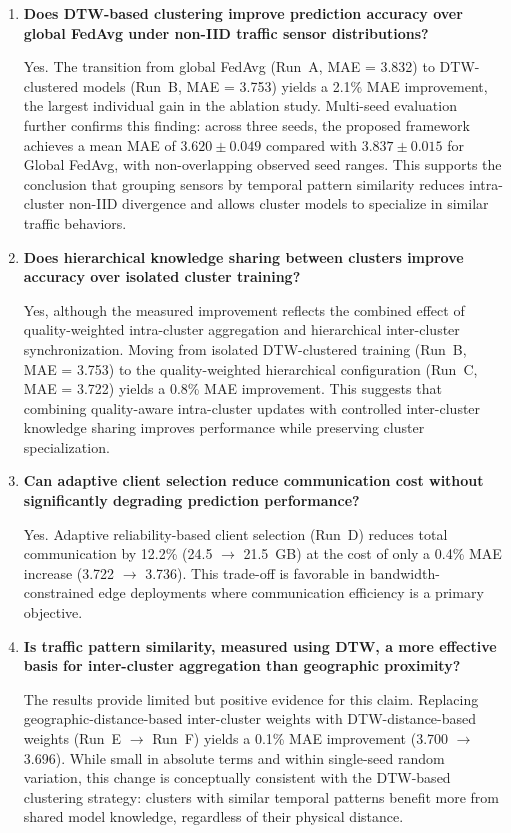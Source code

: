 \begin{enumerate}
    \item \textbf{Does DTW-based clustering improve prediction accuracy over global FedAvg under non-IID traffic sensor distributions?}

    Yes. The transition from global FedAvg (Run~A, MAE = 3.832) to DTW-clustered models (Run~B, MAE = 3.753) yields a 2.1\% MAE improvement, the largest individual gain in the ablation study. Multi-seed evaluation further confirms this finding: across three seeds, the proposed framework achieves a mean MAE of $3.620 \pm 0.049$ compared with $3.837 \pm 0.015$ for Global FedAvg, with non-overlapping observed seed ranges. This supports the conclusion that grouping sensors by temporal pattern similarity reduces intra-cluster non-IID divergence and allows cluster models to specialize in similar traffic behaviors.

    \item \textbf{Does hierarchical knowledge sharing between clusters improve accuracy over isolated cluster training?}

    Yes, although the measured improvement reflects the combined effect of quality-weighted intra-cluster aggregation and hierarchical inter-cluster synchronization. Moving from isolated DTW-clustered training (Run~B, MAE = 3.753) to the quality-weighted hierarchical configuration (Run~C, MAE = 3.722) yields a 0.8\% MAE improvement. This suggests that combining quality-aware intra-cluster updates with controlled inter-cluster knowledge sharing improves performance while preserving cluster specialization.

    \item \textbf{Can adaptive client selection reduce communication cost without significantly degrading prediction performance?}

    Yes. Adaptive reliability-based client selection (Run~D) reduces total communication by 12.2\% (24.5 $\to$ 21.5~GB) at the cost of only a 0.4\% MAE increase (3.722 $\to$ 3.736). This trade-off is favorable in bandwidth-constrained edge deployments where communication efficiency is a primary objective.

   \item \textbf{Is traffic pattern similarity, measured using DTW, a more effective basis for inter-cluster aggregation than geographic proximity?}

    The results provide limited but positive evidence for this claim. Replacing geographic-distance-based inter-cluster weights with DTW-distance-based weights (Run~E $\to$ Run~F) yields a 0.1\% MAE improvement (3.700 $\to$ 3.696). While small in absolute terms and within single-seed random variation, this change is conceptually consistent with the DTW-based clustering strategy: clusters with similar temporal patterns benefit more from shared model knowledge, regardless of their physical distance.
\end{enumerate}

